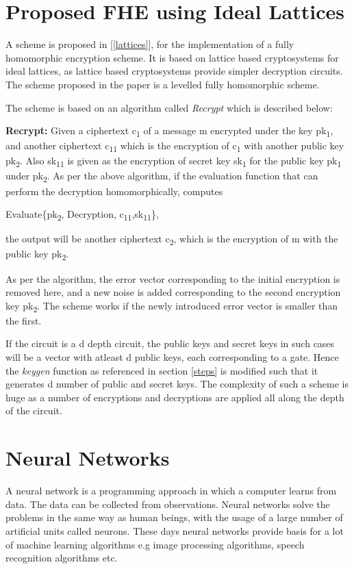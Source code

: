 \section{Proposed FHE using Ideal Lattices} \label{FHE}
A scheme is proposed in [\ref{lattices}], for the implementation of a fully homomorphic encryption scheme. It is based on lattice based cryptosystems for ideal lattices, as lattice based cryptosystems provide simpler decryption circuits. The scheme proposed in the paper is a levelled fully homomorphic scheme.

 \noindent The scheme is based on an algorithm called \textit{Recrypt} which is described below:
 
\vspace{0.25cm} \label{refresh}
\noindent \textbf{Recrypt:} Given a ciphertext c\textsubscript{1} of a message m encrypted under the key pk\textsubscript{1}, and another ciphertext c\textsubscript{11} which is the encryption of c\textsubscript{1} with another public key pk\textsubscript{2}. Also sk\textsubscript{11} is given as the encryption of secret key sk\textsubscript{1} for the public key pk\textsubscript{1} under pk\textsubscript{2}. As per the above algorithm,
if the evaluation function that can perform the decryption homomorphically, computes


\hspace{3cm} Evaluate\{pk\textsubscript{2}, Decryption, c\textsubscript{11},sk\textsubscript{11}\},

 \noindent the output will be another ciphertext c\textsubscript{2}, which is the encryption of m with the public key pk\textsubscript{2}. 
 
 \noindent As per the algorithm, the error vector corresponding to the initial encryption is removed here, and a new noise is added corresponding to the second encryption key pk\textsubscript{2}. The scheme works if the newly introduced error vector is smaller than the first.

 \noindent If the circuit is a d depth circuit, the public keys and secret keys in such cases will be a vector with atleast d public keys, each corresponding to a gate. 
Hence the \textit{keygen} function as referenced in section \ref{steps} is modified such that it generates d number of public and secret keys.
The complexity of such a scheme is huge as a number of encryptions and decryptions are applied all along the depth of the circuit.
\section{Neural Networks}
A neural network is a programming approach in which a computer learns from data. The data can be collected from observations. Neural networks solve the problems in the same way as human beings, with the usage of a large number of artificial units called neurons. These days neural networks provide basis for a lot of machine learning algorithms e.g image processing algorithms, speech recognition algorithms etc.

